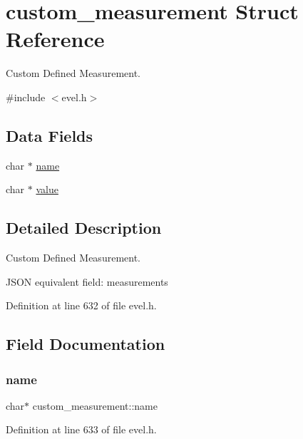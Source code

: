 \hypertarget{structcustom__measurement}{}\section{custom\+\_\+measurement Struct Reference}
\label{structcustom__measurement}


Custom Defined Measurement.  




{\ttfamily \#include $<$evel.\+h$>$}

\subsection*{Data Fields}
\begin{DoxyCompactItemize}
\item 
char $\ast$ \hyperlink{structcustom__measurement_aef6a77f95bc1675dccc662585147cb75}{name}
\item 
char $\ast$ \hyperlink{structcustom__measurement_a298f50c4dd8d508b3a6d6f0aba1ddbaa}{value}
\end{DoxyCompactItemize}


\subsection{Detailed Description}
Custom Defined Measurement. 

J\+S\+ON equivalent field\+: measurements 

Definition at line 632 of file evel.\+h.



\subsection{Field Documentation}
\hypertarget{structcustom__measurement_aef6a77f95bc1675dccc662585147cb75}{}\label{structcustom__measurement_aef6a77f95bc1675dccc662585147cb75} 
\subsubsection{\texorpdfstring{name}{name}}
{\footnotesize\ttfamily char$\ast$ custom\+\_\+measurement\+::name}



Definition at line 633 of file evel.\+h.

\hypertarget{structcustom__measurement_a298f50c4dd8d508b3a6d6f0aba1ddbaa}{}\label{structcustom__measurement_a298f50c4dd8d508b3a6d6f0aba1ddbaa} 
